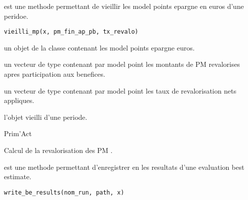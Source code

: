\documentclass[a4paper]{book}
\begin{document}
%
\begin{Description}\relax
{} est une methode permettant de vieillir
les model points epargne en euros d'une peridoe.
\end{Description}
%
\begin{Usage}
\begin{verbatim}
vieilli_mp(x, pm_fin_ap_pb, tx_revalo)
\end{verbatim}
\end{Usage}
%
\begin{Arguments}
\begin{ldescription}
\item[\code{x}] un objet de la classe  contenant les model points epargne euros.

\item[\code{pm\_fin\_ap\_pb}] un vecteur de type  contenant par model point
les montants de PM revalorises apres participation aux benefices.

\item[\code{tx\_revalo}] un vecteur de type  contenant par model point
les taux de revalorisation nets appliques.
\end{ldescription}
\end{Arguments}
%
\begin{Value}
l'objet  vieilli d'une periode.
\end{Value}
%
\begin{Author}\relax
Prim'Act
\end{Author}
%
\begin{SeeAlso}\relax
Calcul de la revalorisation des PM .
\end{SeeAlso}
%
\begin{Description}\relax
{} est une methode permettant d'enregistrer en  les resultats
d'une evaluation best estimate.
\end{Description}
%
\begin{Usage}
\begin{verbatim}
write_be_results(nom_run, path, x)
\end{verbatim}
\end{Usage}
\end{document}
